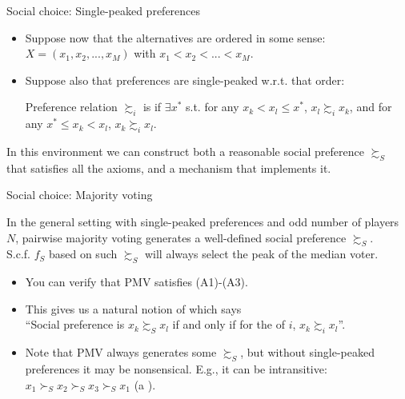 \documentclass[english,10pt
,aspectratio=169
]{beamer}
\begin{document}
\begin{frame}{Social choice: Single-peaked preferences}
	\begin{itemize}
		\item Suppose now that the alternatives are ordered in some sense: \\
		$X = (x_1, x_2, ..., x_M)$ with $x_1 < x_2 < ... < x_M$.
		\item Suppose also that preferences are single-peaked w.r.t. that order:
		\begin{exampleblock}{}
			Preference relation $\succsim_i$ is  if $\exists x^*$ s.t. for any $x_k < x_l\leq x^*$, $x_l \succsim_i x_k$, and for any $x^* \leq x_k < x_l$, $x_k \succsim_i x_l$.
		\end{exampleblock}
	\end{itemize}
	In this environment  we can construct both a reasonable social preference $\succsim_S$ that satisfies all the axioms, and a mechanism that implements it.
\end{frame}


\begin{frame}{Social choice: Majority voting}
	\begin{theorem}[MWG 21.D.1-2]
		In the general setting with single-peaked preferences and odd number of players $N$, \alert{pairwise majority voting} generates a well-defined social preference $\succsim_S$.
		\\
		S.c.f. $f_S$ based on such $\succsim_S$ will always select the peak of the median voter.
	\end{theorem}
	\begin{itemize}
		\item You can verify that PMV satisfies (A1)-(A3).
		
		\item This gives us a natural notion of  which says \\
		``Social preference is $x_k \succsim_S x_l$ if and only if for the  of $i$,  $x_k \succsim_i x_l$''.
		
		\item Note that PMV always generates some $\succsim_S$, but without single-peaked preferences it may be nonsensical. E.g., it can be intransitive: $x_1 \succ_S x_2 \succ_S x_3 \succ_S x_1$ (a ).
	\end{itemize}
\end{frame}
\end{document}
